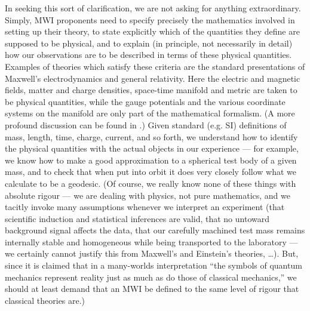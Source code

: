 \documentclass[aps,pra,12pt]{revtex4}
\begin{document}
In seeking this sort of clarification, we are not asking for anything 
extraordinary.  Simply, MWI proponents need to specify precisely the
mathematics involved in setting up their theory, to state 
explicitly which of the quantities they define are supposed to be 
physical, and to explain (in principle, not necessarily in detail) how our 
observations are
to be described in terms of these physical quantities.  
Examples of theories which satisfy these criteria are the standard 
presentations of Maxwell's electrodynamics and general relativity.
Here the electric and magnetic fields, matter and charge
densities, space-time manifold and metric are taken to be physical quantities,
while the gauge potentials and the various coordinate systems on the manifold
are only part of the mathematical formalism. 
(A more profound discussion can be found in \cite{bell4}.) 
Given standard (e.g. SI) definitions of mass, length, time, charge, 
current, and so forth, we understand how to identify the physical quantities
with the actual objects in our experience --- for example, we know how
to make a good approximation to a spherical test body of a given mass, and to
check that when put into orbit it does very closely follow what we calculate
to be a geodesic. 
(Of course, we really know none of these things with absolute rigour --- we are
dealing with physics, not pure mathematics, and we tacitly invoke many 
assumptions whenever we interpret an experiment (that scientific induction and
statistical inferences are valid, that no untoward background signal affects 
the data, that our carefully machined test mass remains internally stable and 
homogeneous while being transported to the laboratory --- we certainly cannot 
justify this from Maxwell's and Einstein's theories, \ldots). 
But, since it is claimed that in a many-worlds interpretation 
``the symbols
of quantum mechanics represent reality just as much as do those of 
classical mechanics,''\cite{dew} we should at least demand that an MWI 
be defined to the same level of rigour that classical theories are.) 
\end{document}
